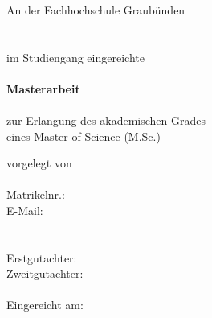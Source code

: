 \begin{titlepage}
    \begin{center}
        {\large
            {\Large\textbf{\haupttitel}} \\
            \textit{\untertitel} \\
            ~\\
            An der Fachhochschule Graubünden \\
            \department \\
            \institute \\
            \vspace{2mm}
            im Studiengang \studiengang{} eingereichte \\
            ~\\
            {\Huge\textbf{Masterarbeit}} \\
            ~\\
            zur Erlangung des akademischen Grades \\
            eines Master of Science (M.Sc.)
    
            \vspace{40mm}
            vorgelegt von \\
            \vspace{4mm}
            {\Large\textbf{\autorenschaft}} \\
            \vspace{4mm}
            Matrikelnr.: \matrikelnummer \\
            E-Mail: \email \\
            ~\\~\\
            Erstgutachter:  \\
            Zweitgutachter: \coRefe \\
            ~\\
            Eingereicht am: \abgabedatum
        } %
    \end{center}
\end{titlepage}
